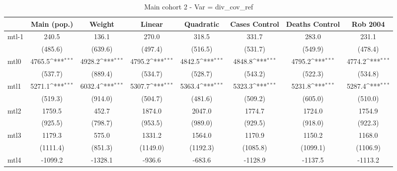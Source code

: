 \documentclass{article}
\begin{document}
{
\def\sym#1{\ifmmode^{#1}\else\(^{#1}\)\fi}
\begin{longtable}{l*{7}{c}}
\caption{Main cohort 2 - Var = div\_cov\_ref}\\
\hline\hline\endfirsthead\hline\endhead\hline\endfoot\endlastfoot
                &\multicolumn{1}{c}{Main (pop.)}&\multicolumn{1}{c}{Weight}&\multicolumn{1}{c}{Linear}&\multicolumn{1}{c}{Quadratic}&\multicolumn{1}{c}{Cases Control}&\multicolumn{1}{c}{Deaths Control}&\multicolumn{1}{c}{Rob 2004}\\
\hline
mtl-1           &    240.5         &    136.1         &    270.0         &    318.5         &    331.7         &    283.0         &    231.1         \\
                &  (485.6)         &  (639.6)         &  (497.4)         &  (516.5)         &  (531.7)         &  (549.9)         &  (478.4)         \\
mtl0            &   4765.5\sym{***}&   4928.2\sym{***}&   4795.2\sym{***}&   4842.5\sym{***}&   4848.8\sym{***}&   4795.2\sym{***}&   4774.2\sym{***}\\
                &  (537.7)         &  (889.4)         &  (534.7)         &  (528.7)         &  (543.2)         &  (522.3)         &  (534.8)         \\
mtl1            &   5271.1\sym{***}&   6032.4\sym{***}&   5307.7\sym{***}&   5363.4\sym{***}&   5323.3\sym{***}&   5231.8\sym{***}&   5287.4\sym{***}\\
                &  (519.3)         &  (914.0)         &  (504.7)         &  (481.6)         &  (509.2)         &  (605.0)         &  (510.0)         \\
mtl2            &   1759.5         &    452.7         &   1874.0         &   2047.0         &   1774.7         &   1724.0         &   1754.9         \\
                &  (925.5)         &  (798.7)         &  (953.5)         &  (989.0)         &  (929.5)         &  (918.0)         &  (922.3)         \\
mtl3            &   1179.3         &    575.0         &   1331.2         &   1564.0         &   1170.9         &   1150.2         &   1168.0         \\
                & (1111.4)         &  (851.3)         & (1149.0)         & (1192.3)         & (1085.8)         & (1099.1)         & (1106.9)         \\
mtl4            &  -1099.2         &  -1328.1         &   -936.6         &   -683.6         &  -1128.9         &  -1137.5         &  -1113.2         \\

\end{longtable}}
\end{document}
